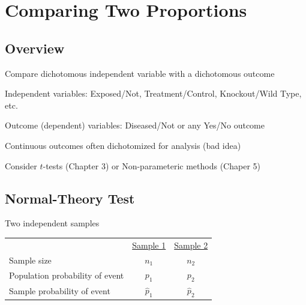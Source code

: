 
\chapter{Comparing Two Proportions} 

\section{Overview}

\bi
 \item Compare dichotomous independent variable with a dichotomous outcome
  \bi
  \item Independent variables: Exposed/Not, Treatment/Control, Knockout/Wild Type, etc.
  \item Outcome (dependent) variables: Diseased/Not or any Yes/No outcome 
  \ei
 \item Continuous outcomes often dichotomized for analysis (bad idea)
  \bi
  \item Consider $t$-tests (Chapter 3) or Non-parameteric methods (Chaper 5)
  \ei
\ei

\section{Normal-Theory Test}
\bi
\item Two independent samples

\begin{tabular}{lcc} 
 & \underline{Sample 1} & \underline{Sample 2} \\
Sample size & $n_1$ & $n_2$ \\
Population probability of event & $p_1$ & $p_2$ \\
Sample probability of event & $\hat{p}_1$ & $\hat{p}_2$ \\
\end{tabular}

